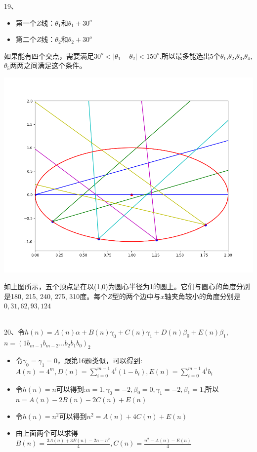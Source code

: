 \documentclass[onecolumn]{article}
\begin{document}
19、
\begin{itemize}
	\item 第一个$Z$线：$\theta_{1}$和$\theta_{1}+30^{o}$
	\item 第二个$Z$线：$\theta_{2}$和$\theta_{2} +30^{o}$
\end{itemize}
如果能有四个交点，需要满足$30^{o}<|\theta_{1} - \theta_{2}| < 150^{o}$.所以最多能选出5个$\theta_{1}$,$\theta_{2}$,$\theta_{3}$,$\theta_{4}$,$\theta_{5}$两两之间满足这个条件。\par
\includegraphics[scale=0.54]{pic1.png} 

如上图所示，五个顶点是在以(1,0)为圆心半径为1的圆上。它们与圆心的角度分别是180, 215, 240, 275, 310度。每个$Z$型的两个边中与$x$轴夹角较小的角度分别是$0,31,62,93,124$ 
\par ~\\

20、令$h(n)=A(n)\alpha +B(n)\gamma _{0}+C(n)\gamma _{1}+D(n)\beta _{0}+E(n)\beta _{1}$,$n=(1b_{m-1}b_{m-2}...b_{2}b_{1}b_{0})_{2}$
\begin{itemize}
	\item 令$\gamma_{0}=\gamma_{1}=0$，跟第16题类似，可以得到:$A(n)=4^m,D(n)=\sum_{i=0}^{m-1}4^{i}(1-b_{i}), E(n)=\sum_{i=0}^{m-1}4^{i}b_{i}$
	\item 令$h(n)=n$可以得到:$\alpha=1,\gamma_{0}=-2,\beta_{0}=0,\gamma_{1}=-2,\beta_{1}=1$,所以$n=A(n)-2B(n)-2C(n)+E(n)$
	\item 令$h(n)=n^{2}$可以得到$n^{2}=A(n)+4C(n)+E(n)$
	\item 由上面两个可以求得$B(n)=\frac{3A(n)+3E(n)-2n-n^{2}}{4},C(n)=\frac{n^{2}-A(n)-E(n)}{4}$
\end{itemize}
\end{document}
